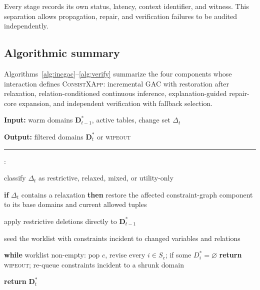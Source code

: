 \documentclass[pdflatex,sn-mathphys-num,iicol,oneside]{sn-jnl}
\newcommand{\algin}[1]{\textbf{Input:} #1\par}
\newcommand{\algout}[1]{\textbf{Output:} #1\par\vspace{2pt}\hrule\vspace{3pt}}
\newenvironment{algsteps}%
  {\begin{list}{\arabic{algstepc}:}%
     {\usecounter{algstepc}\setlength{\leftmargin}{1.6em}%
      \setlength{\itemsep}{1pt}\setlength{\parsep}{0pt}}}%
  {\end{list}}
\newcounter{algstepc}
\newcommand{\method}{\textsc{ConsistXApp}}
\begin{document}
Every stage records its own status, latency, context identifier, and
witness. This separation allows propagation, repair, and verification
failures to be audited independently.

\subsection{Algorithmic summary}
\label{sec:algorithms}

Algorithms~\ref{alg:incgac}--\ref{alg:verify} summarize the four
components whose interaction defines \method: incremental GAC with
restoration after relaxation, relation-conditioned continuous
inference, explanation-guided repair-core expansion, and independent
verification with fallback selection.

\begin{algorithm}[t]
\caption{Incremental GAC with restoration after relaxation}
\label{alg:incgac}
\small
\algin{warm domains $\bm{D}^{*}_{t-1}$, active tables, change set $\Delta_t$}
\algout{filtered domains $\bm{D}^{*}_t$ or \textsc{wipeout}}
\begin{algsteps}
\item classify $\Delta_t$ as restrictive, relaxed, mixed, or utility-only
\item \textbf{if} $\Delta_t$ contains a relaxation \textbf{then} restore
the affected constraint-graph component to its base domains and current
allowed tuples
\item apply restrictive deletions directly to $\bm{D}^{*}_{t-1}$
\item seed the worklist with constraints incident to changed variables
and relations
\item \textbf{while} worklist non-empty: pop $c$, revise every
$i\in S_c$; if some $D_i^{*}=\varnothing$ \textbf{return}
\textsc{wipeout}; re-queue constraints incident to a shrunk domain
\item \textbf{return} $\bm{D}^{*}_t$
\end{algsteps}
\end{algorithm}
\end{document}
